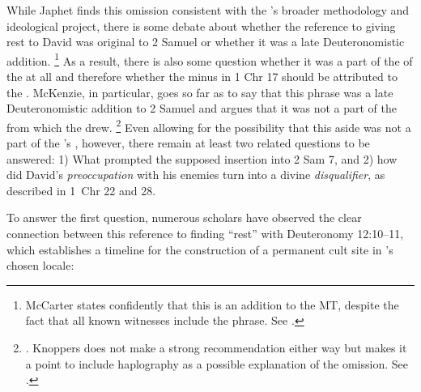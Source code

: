 While Japhet finds this omission consistent with the \chronicler's broader methodology and ideological project,%
    \autocite[328]{japhet1993}
there is some debate about whether the reference to \yahweh giving rest to David was original to 2 Samuel or whether it was a late Deuteronomistic addition.%
    \footnote{McCarter states confidently that this is an addition to the MT, despite the fact that all known witnesses include the phrase. See \cite[191]{mccarter1984}.}
As a result, there is also some question whether it was a part of the \vorlage of the \chronicler at all and therefore whether the minus in 1 Chr 17 should be attributed to the \chronicler. McKenzie, in particular, goes so far as to say that this phrase was a late Deuteronomistic addition to 2 Samuel and argues that it was not a part of the \vorlage from which the \chronicler drew.%
    \footnote{\Cite[63]{mckenzie1985}. Knoppers does not make a strong recommendation either way but makes it a point to include haplography as a possible explanation of the omission. See \cite[666]{knoppers2007}.}
Even allowing for the possibility that this aside was not a part of the \chronicler's \vorlage, however, there remain at least two related questions to be answered: 1) What prompted the supposed insertion into 2 Sam 7, and 2) how did David's \emph{preoccupation} with his enemies turn into a divine \emph{disqualifier}, as described in 1~Chr 22 and 28.

To answer the first question, numerous scholars have observed the clear connection between this reference to finding ``rest'' with Deuteronomy 12:10--11, which establishes a timeline for the construction of a permanent cult site in \yahweh's chosen locale:

